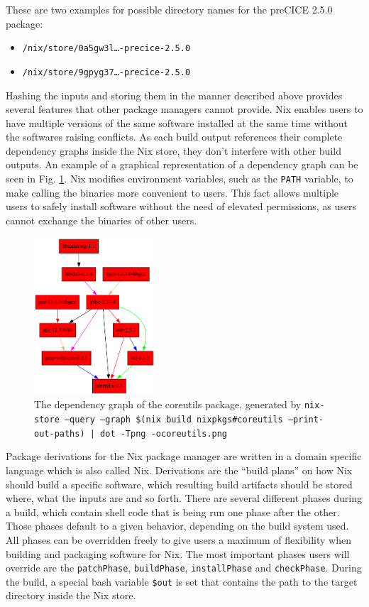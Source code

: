 \documentclass{eceasst}
\begin{document}
These are two examples for possible directory names for the preCICE 2.5.0 package:

\begin{itemize}
  \item \texttt{/nix/store/0a5gw3l\ldots-precice-2.5.0}
  \item \texttt{/nix/store/9gpyg37\ldots-precice-2.5.0}
\end{itemize}

Hashing the inputs and storing them in the manner described above provides several features that other package managers cannot provide.
Nix enables users to have multiple versions of the same software installed at the same time without the softwares raising conflicts.
As each build output references their complete dependency graphs inside the Nix store, they don't interfere with other build outputs.
An example of a graphical representation of a dependency graph can be seen in Fig. \ref{fig:nix-graph}.
Nix modifies environment variables, such as the \texttt{PATH} variable, to make calling the binaries more convenient to users.
This fact allows multiple users to safely install software without the need of elevated permissions, as users cannot exchange the binaries of other users.

\begin{figure}
    \centering
    \includegraphics[width=0.4\textwidth]{figures/coreutils.png}
    \caption{The dependency graph of the coreutils package, generated by \texttt{nix-store --query --graph \$(nix build nixpkgs\#coreutils --print-out-paths) | dot -Tpng -ocoreutils.png}}
    \label{fig:nix-graph}
\end{figure}

Package derivations for the Nix package manager are written in a domain specific language which is also called Nix.
Derivations are the ``build plans'' on how Nix should build a specific software, which resulting build artifacts should be stored where, what the inputs are and so forth.
There are several different phases during a build, which contain shell code that is being run one phase after the other.
Those phases default to a given behavior, depending on the build system used.
All phases can be overridden freely to give users a maximum of flexibility when building and packaging software for Nix.
The most important phases users will override are the \texttt{patchPhase}, \texttt{buildPhase}, \texttt{installPhase} and \texttt{checkPhase}.
During the build, a special bash variable \texttt{\$out} is set that contains the path to the target directory inside the Nix store.
\end{document}
